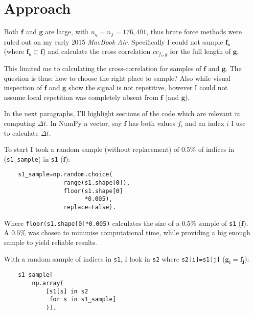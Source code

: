 \documentclass[prb,11pt,twocolumn]{revtex4-1}
\begin{document}

\section{Approach}
Both $\mathbf{f}$ and $\mathbf{g}$ are large, with $n_g = n_f = 176,401$, thus brute force methods were ruled out on my early 2015 \textit{MacBook Air}. Specifically I could not sample $\mathbf{f_s}$ (where $\mathbf{f_s} \subset \mathbf{f}$) and calculate the cross correlation $cc_{f_s,g}$ for the full length of $\mathbf{g}$.

This limited me to calculating the cross-correlation for samples of $\mathbf{f}$ and $\mathbf{g}$. The question is thus: how to choose the right place to sample? Also while visual inspection of $\mathbf{f}$ and $\mathbf{g}$ show the signal is not repetitive, however I could not assume local repetition was completely absent from $\mathbf{f}$ (and $\mathbf{g}$).

In the next paragraphs, I'll highlight sections of the code which are relevant in computing $\Delta t$. In NumPy a vector, say $\mathbf{f}$ has both values $f_i$ and an index $i$ I use to calculate $\Delta t$.

To start I took a random sample (without replacement) of $0.5\%$ of indices in (\texttt{s1\_sample}) in \texttt{s1} ($\mathbf{f}$):

\begin{verbatim}
    s1_sample=np.random.choice(
                 range(s1.shape[0]),
                 floor(s1.shape[0]
                       *0.005),
                 replace=False).
\end{verbatim}

Where \texttt{floor(s1.shape[0]*0.005)} calculates the size of a $0.5\%$ sample of \texttt{s1} ($\mathbf{f}$). A $0.5\%$ was chosen to minimise computational time, while providing a big enough sample to yield reliable results. 

With a random sample of indices in \texttt{s1}, I look in \texttt{s2} where \texttt{s2[i]=s1[j]} ($\mathbf{g_i}=\mathbf{f_j}$):

\begin{verbatim}
    s1_sample[
        np.array(
            [s1[s] in s2 
             for s in s1_sample]
            )].
\end{verbatim}
\end{document}
